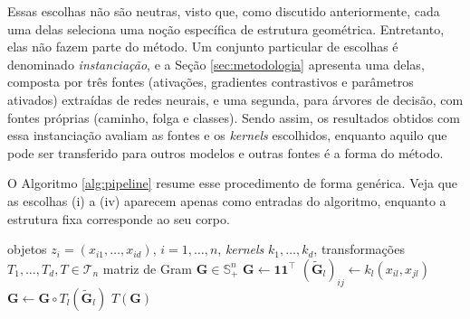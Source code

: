 Essas escolhas não são neutras, visto que, como discutido anteriormente, cada uma delas seleciona uma noção específica de estrutura geométrica. Entretanto, elas não fazem parte do método. Um conjunto particular de escolhas é denominado \emph{instanciação}, e a Seção \ref{sec:metodologia} apresenta uma delas, composta por três fontes (ativações, gradientes contrastivos e parâmetros ativados) extraídas de redes neurais, e uma segunda, para árvores de decisão, com fontes próprias (caminho, folga e classes). Sendo assim, os resultados obtidos com essa instanciação avaliam as fontes e os \textit{kernels} escolhidos, enquanto aquilo que pode ser transferido para outros modelos e outras fontes é a forma do método.

O Algoritmo \ref{alg:pipeline} resume esse procedimento de forma genérica. Veja que as escolhas (i) a (iv) aparecem apenas como entradas do algoritmo, enquanto a estrutura fixa corresponde ao seu corpo.

\begin{algorithm}[htbp]
\caption{\textit{Pipeline} núcleo-transformação}
\label{alg:pipeline}
\begin{algorithmic}[1]
\Require objetos $z_i = (x_{i1},\dots,x_{id})$, $i = 1,\dots,n$, \textit{kernels} $k_1,\dots,k_d$, transformações $T_1,\dots,T_d, T \in \mathcal{T}_n$
\Ensure matriz de Gram $\mathbf{G} \in \mathbb{S}_+^n$
\State $\mathbf{G} \gets \mathbf{1}\mathbf{1}^\top$
        \State $(\widetilde{\mathbf{G}}_l)_{ij} \gets k_l(x_{il}, x_{jl})$ 
    \EndFor
    \State $\mathbf{G} \gets \mathbf{G} \circ T_l(\widetilde{\mathbf{G}}_l)$ 
\EndFor
\State \Return $T(\mathbf{G})$
\end{algorithmic}
\end{algorithm}